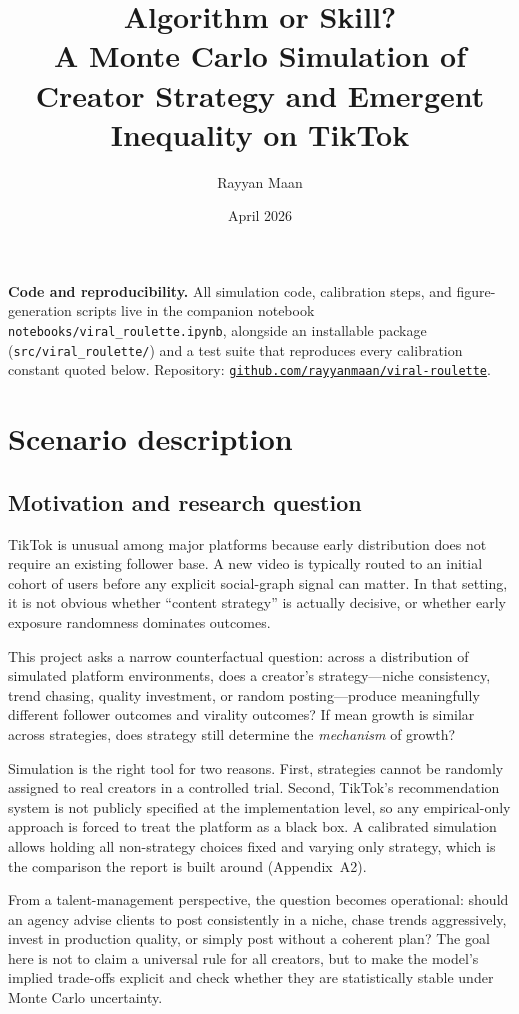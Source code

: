 \documentclass[10pt]{article}
\title{\vspace{-1.2em}
Algorithm or Skill?\\
\large A Monte Carlo Simulation of Creator Strategy and Emergent Inequality on TikTok}
\author{Rayyan Maan}
\date{April 2026}
\newcommand{\appref}[1]{(Appendix~#1)}
\begin{document}
\maketitle
\thispagestyle{plain}

\noindent\textbf{Code and reproducibility.}
All simulation code, calibration steps, and figure-generation scripts live in the companion
notebook \texttt{notebooks/viral\_roulette.ipynb}, alongside an installable package
(\texttt{src/viral\_roulette/}) and a test suite that reproduces every calibration constant
quoted below. Repository: \href{https://github.com/rayyanmaan/viral-roulette}{\texttt{github.com/rayyanmaan/viral-roulette}}.

\tableofcontents
\vspace{0.5em}

\section{Scenario description}
\subsection{Motivation and research question}
TikTok is unusual among major platforms because early distribution does not require an existing follower base. A new video is typically routed to an initial cohort of users before any explicit social-graph signal can matter. In that setting, it is not obvious whether ``content strategy'' is actually decisive, or whether early exposure randomness dominates outcomes.

This project asks a narrow counterfactual question: across a distribution of simulated platform environments, does a creator's strategy---niche consistency, trend chasing, quality investment, or random posting---produce meaningfully different follower outcomes and virality outcomes? If mean growth is similar across strategies, does strategy still determine the \emph{mechanism} of growth?

Simulation is the right tool for two reasons. First, strategies cannot be randomly assigned to real creators in a controlled trial. Second, TikTok's recommendation system is not publicly specified at the implementation level, so any empirical-only approach is forced to treat the platform as a black box. A calibrated simulation allows holding all non-strategy choices fixed and varying only strategy, which is the comparison the report is built around \appref{A2}.

From a talent-management perspective, the question becomes operational: should an agency advise clients to post consistently in a niche, chase trends aggressively, invest in production quality, or simply post without a coherent plan? The goal here is not to claim a universal rule for all creators, but to make the model's implied trade-offs explicit and check whether they are statistically stable under Monte Carlo uncertainty.
\end{document}
